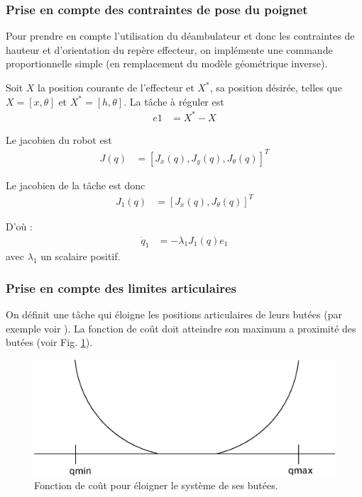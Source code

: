 \documentclass[a4paper, 10pt ]{article}
\begin{document}
\subsubsection{Prise en compte des contraintes de pose du poignet}

Pour prendre en compte l'utilisation du déambulateur et donc les contraintes de hauteur et d'orientation du repère effecteur, on implémente une commande proportionnelle simple (en remplacement du modèle géométrique inverse). 

Soit $X$ la position courante de l'effecteur et $X^*$, sa position désirée, telles que $X=[x,\theta]$ et $X^*=[h,\theta ]$.
La tâche à réguler est 
\begin{align}
e1&=X^*-X
\end{align}

Le jacobien du robot est 
\begin{align}
J(q)&=[J_x(q) , J_y(q), J_{\theta}(q)]^T
\end{align} 

Le jacobien de la tâche est donc 
\begin{align}
J_1(q)&=[J_x(q) , J_{\theta}(q)]^T
\end{align}

D'où :
\begin{align}
		\dot q_1 &= -\lambda_1 J_1(q)e_1
\end{align}
\noindent avec $\lambda_1$ un scalaire positif.

\subsubsection{Prise en compte des limites articulaires}

On définit une tâche qui éloigne les positions articulaires de leurs butées (par exemple voir \cite{Chaumette01}).
La fonction de coût doit atteindre son maximum a proximité des butées (voir Fig. \ref{fig:butees}). \\

\begin{figure}[h]
\centering
\includegraphics[width=0.5\columnwidth]{images/model/butees.eps}
\caption{Fonction de coût pour éloigner le système de ses butées.}
\label{fig:butees}
\end{figure}
\end{document}
